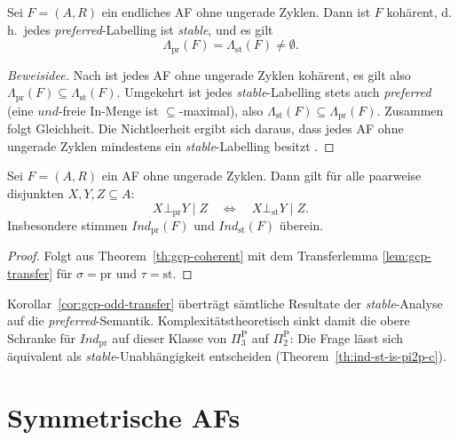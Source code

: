 \begin{Theorem}
    \label{th:gcp-coherent}
    Sei \(F=(A,R)\) ein endliches AF ohne ungerade Zyklen. Dann ist \(F\)
    koh\"arent, d.\,h.\ jedes \textit{preferred}-Labelling ist
    \textit{stable}, und es gilt
    \[
        \Lambda_{\mathrm{pr}}(F)=\Lambda_{\mathrm{st}}(F)\neq\emptyset.
    \]
\end{Theorem}

\begin{proof}[Beweisidee]
    Nach \textcite{dung:1995:af} ist jedes AF ohne ungerade Zyklen koh\"arent,
    es gilt also \(\Lambda_{\mathrm{pr}}(F)\subseteq\Lambda_{\mathrm{st}}(F)\).
    Umgekehrt ist jedes \textit{stable}-Labelling stets auch \textit{preferred}
    (eine \(\mathit{und}\)-freie In-Menge ist \(\subseteq\)-maximal), also
    \(\Lambda_{\mathrm{st}}(F)\subseteq\Lambda_{\mathrm{pr}}(F)\). Zusammen folgt
    Gleichheit. Die Nichtleerheit ergibt sich daraus, dass jedes AF ohne
    ungerade Zyklen mindestens ein \textit{stable}-Labelling besitzt
    \cite{dung:1995:af,handbook__of_formal_argumentation__vol__3:2024}.
\end{proof}

\begin{Corollary}
    \label{cor:gcp-odd-transfer}
    Sei \(F=(A,R)\) ein AF ohne ungerade Zyklen. Dann gilt f\"ur alle paarweise
    disjunkten \(X,Y,Z\subseteq A\):
    \[
        X\bot_{\mathrm{pr}}Y\mid Z
        \quad\Longleftrightarrow\quad
        X\bot_{\mathrm{st}}Y\mid Z.
    \]
    Insbesondere stimmen \(\textit{Ind}_{\mathrm{pr}}(F)\) und
    \(\textit{Ind}_{\mathrm{st}}(F)\) \"uberein.
\end{Corollary}

\begin{proof}
    Folgt aus Theorem~\ref{th:gcp-coherent} mit dem Transferlemma
    \ref{lem:gcp-transfer} f\"ur \(\sigma=\mathrm{pr}\) und
    \(\tau=\mathrm{st}\).
\end{proof}

Korollar~\ref{cor:gcp-odd-transfer} \"ubertr\"agt s\"amtliche Resultate der
\textit{stable}-Analyse auf die \textit{preferred}-Semantik. Komplexit\"atstheoretisch
sinkt damit die obere Schranke f\"ur \(\textit{Ind}_{\mathrm{pr}}\) auf dieser
Klasse von \(\Pi_3^{\mathrm P}\) auf \(\Pi_2^{\mathrm P}\): Die Frage l\"asst sich
\"aquivalent als \textit{stable}-Unabh\"angigkeit entscheiden
(Theorem~\ref{th:ind-st-is-pi2p-c}).

\section{Symmetrische AFs}
\label{sec:gcp-sym}


